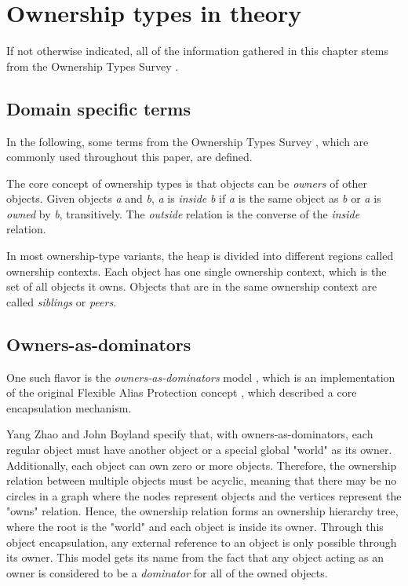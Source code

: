 \documentclass[sigplan,11pt,nonacm]{acmart}
\begin{document}

\section{Ownership types in theory}
\label{sec:theory}

If not otherwise indicated, all of the information gathered in this chapter stems from the Ownership Types Survey \cite{ownership-types-survey}.


\subsection{Domain specific terms}
\label{sec:domain-specific-terms}

In the following, some terms from the Ownership Types Survey \cite{ownership-types-survey}, which are commonly used throughout this paper, are defined.

The core concept of ownership types is that objects can be \emph{owners} of other objects.
Given objects \emph{a} and \emph{b}, \emph{a} is \emph{inside} \emph{b} if \emph{a} is the same object as \emph{b} or \emph{a} is \emph{owned} by \emph{b}, transitively.
The \emph{outside} relation is the converse of the \emph{inside} relation.

In most ownership-type variants, the heap is divided into different regions called ownership contexts.
Each object has one single ownership context, which is the set of all objects it owns.
Objects that are in the same ownership context are called \emph{siblings} or \emph{peers}.


\subsection{Owners-as-dominators}
\label{sec:owners-as-dominators}

One such flavor is the \emph{owners-as-dominators} model \cite{ownership-types-survey}, which is an implementation of the original Flexible Alias Protection concept \cite{flexible-alias-protection}, which described a core encapsulation mechanism.

Yang Zhao and John Boyland \cite{permission-ownership-types} specify that, with owners-as-dominators, each regular object must have another object or a special global "world" as its owner.
Additionally, each object can own zero or more objects.
Therefore, the ownership relation between multiple objects must be acyclic, meaning that there may be no circles in a graph where the nodes represent objects and the vertices represent the "owns" relation.
Hence, the ownership relation forms an ownership hierarchy tree, where the root is the "world" and each object is inside its owner.
Through this object encapsulation, any external reference to an object is only possible through its owner.
This model gets its name from the fact that any object acting as an owner is considered to be a \emph{dominator} for all of the owned objects.
\end{document}
